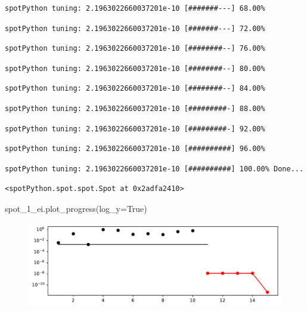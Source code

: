\documentclass[
  letterpaper,
  DIV=11,
  numbers=noendperiod]{scrreprt}
\newenvironment{Shaded}{\begin{snugshade}}{\end{snugshade}}
\newcommand{\NormalTok}[1]{\textcolor[rgb]{0.00,0.23,0.31}{#1}}
\newcommand{\OperatorTok}[1]{\textcolor[rgb]{0.37,0.37,0.37}{#1}}
\newcommand{\VariableTok}[1]{\textcolor[rgb]{0.07,0.07,0.07}{#1}}
\begin{document}
\begin{verbatim}
spotPython tuning: 2.1963022660037201e-10 [#######---] 68.00% 
\end{verbatim}

\begin{verbatim}
spotPython tuning: 2.1963022660037201e-10 [#######---] 72.00% 
\end{verbatim}

\begin{verbatim}
spotPython tuning: 2.1963022660037201e-10 [########--] 76.00% 
\end{verbatim}

\begin{verbatim}
spotPython tuning: 2.1963022660037201e-10 [########--] 80.00% 
\end{verbatim}

\begin{verbatim}
spotPython tuning: 2.1963022660037201e-10 [########--] 84.00% 
\end{verbatim}

\begin{verbatim}
spotPython tuning: 2.1963022660037201e-10 [#########-] 88.00% 
\end{verbatim}

\begin{verbatim}
spotPython tuning: 2.1963022660037201e-10 [#########-] 92.00% 
\end{verbatim}

\begin{verbatim}
spotPython tuning: 2.1963022660037201e-10 [##########] 96.00% 
\end{verbatim}

\begin{verbatim}
spotPython tuning: 2.1963022660037201e-10 [##########] 100.00% Done...
\end{verbatim}

\begin{verbatim}
<spotPython.spot.spot.Spot at 0x2adfa2410>
\end{verbatim}

\begin{Shaded}
\begin{Highlighting}[]
\NormalTok{spot\_1\_ei.plot\_progress(log\_y}\OperatorTok{=}\VariableTok{True}\NormalTok{)}
\end{Highlighting}
\end{Shaded}

\begin{figure}[H]

{\centering \includegraphics{012_num_spot_ei_files/figure-pdf/cell-11-output-1.pdf}

}

\end{figure}
\end{document}
